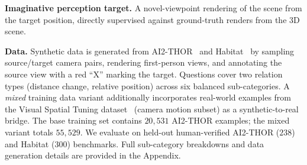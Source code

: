 \noindent\textbf{Imaginative perception target.} A novel-viewpoint rendering of the scene from the target position, directly supervised against ground-truth renders from the 3D scene.

\noindent\textbf{Data.}
Synthetic data is generated from AI2-THOR~\cite{kolve2017ai2} and Habitat~\cite{habitat19iccv,szot2021habitat,puig2023habitat3} by sampling source/target camera pairs, rendering first-person views, and annotating the source view with a red ``X'' marking the target.
Questions cover two relation types (distance change, relative position) across six balanced sub-categories.
A \emph{mixed} training data variant additionally incorporates real-world examples from the Visual Spatial Tuning dataset~\cite{yang2025visual} (camera motion subset) as a synthetic-to-real bridge.
The base training set contains $20{,}531$ AI2-THOR examples; the mixed variant totals $55{,}529$.
We evaluate on held-out human-verified AI2-THOR ($238$) and Habitat ($300$) benchmarks.
Full sub-category breakdowns and data generation details are provided in the Appendix.



